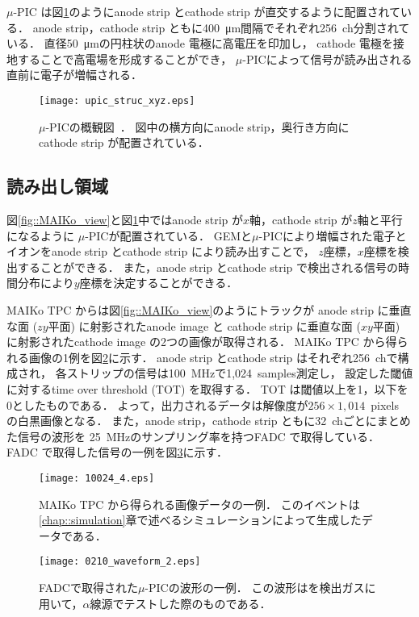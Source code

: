 \documentclass[../master]{subfiles}
\begin{document}
$\mu$-PIC は図\ref{fig::mupic}のようにanode strip とcathode strip が直交するように配置されている．
anode strip，cathode strip ともに\SI{400}{\micro\metre}間隔でそれぞれ256~ch分割されている．
直径\SI{50}{\micro\metre}の円柱状のanode 電極に高電圧を印加し，
cathode 電極を接地することで高電場を形成することができ，
$\mu$-PICによって信号が読み出される直前に電子が増幅される．
\begin{figure}
  \centering
  \texttt{[image: upic\_struc\_xyz.eps]}
  \caption[$\mu$-PICの概観図．]{$\mu$-PICの概観図~\cite{mupic}．
    図中の横方向にanode strip，奥行き方向にcathode strip が配置されている．
  }
  \label{fig::mupic}
\end{figure}

\subsection{読み出し領域}
\label{sec::mu-pic}
図\ref{fig::MAIKo_view}と図\ref{fig::mupic}中ではanode strip が$x$軸，cathode strip が$z$軸と平行になるように
$\mu$-PICが配置されている．
GEMと$\mu$-PICにより増幅された電子とイオンをanode strip とcathode strip により読み出すことで，
$z$座標，$x$座標を検出することができる．
また，anode strip とcathode strip で検出される信号の時間分布により$y$座標を決定することができる．

MAIKo TPC からは図\ref{fig::MAIKo_view}のようにトラックが
anode strip に垂直な面 ($zy$平面) に射影されたanode image と
cathode strip に垂直な面 ($xy$平面) に射影されたcathode image の2つの画像が取得される．
MAIKo TPC から得られる画像の1例を図\ref{fig::track_demo}に示す．
anode strip とcathode strip はそれぞれ256~chで構成され，
各ストリップの信号は\SI{100}{\mega\hertz}で1,024~samples測定し，
設定した閾値に対するtime over threshold (TOT) を取得する．
TOT は閾値以上を1，以下を0としたものである．
よって，出力されるデータは解像度が$256\times1,014$~pixels の白黒画像となる．
また，anode strip，cathode strip ともに32~chごとにまとめた信号の波形を
\SI{25}{\mega\hertz}のサンプリング率を持つFADC で取得している．
FADC で取得した信号の一例を図\ref{fig::FADC_waveform}に示す．
\begin{figure}
  \centering
  \texttt{[image: 10024\_4.eps]}
  \caption[MAIKo TPC から得られる画像データの一例．]
          {MAIKo TPC から得られる画像データの一例．
          このイベントは\ref{chap::simulation}章で述べるシミュレーションによって生成したデータである．}
  \label{fig::track_demo}
\end{figure}
\begin{figure}
  \centering
  \texttt{[image: 0210\_waveform\_2.eps]}
  \caption[FADCで取得された$\mu$-PICの波形の一例．]
          {FADCで取得された$\mu$-PICの波形の一例．
          この波形は\isoButaneHydro を検出ガスに用いて，$\alpha$線源でテストした際のものである．}
  \label{fig::FADC_waveform}
\end{figure}
\end{document}
